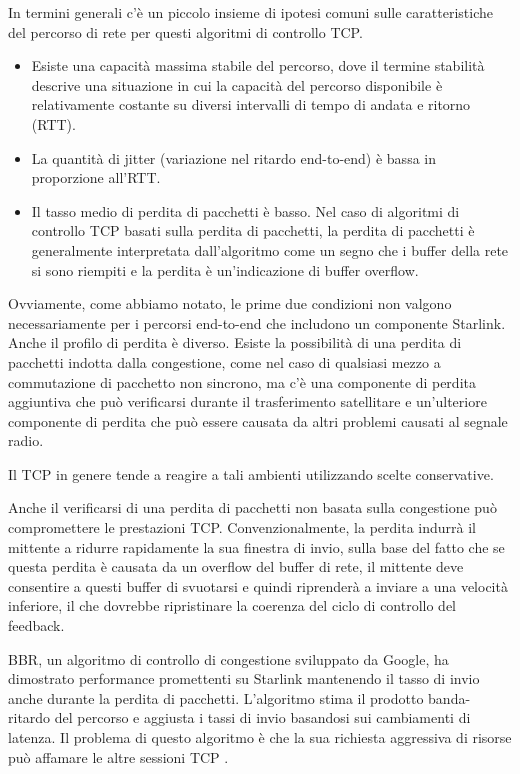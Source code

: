 In termini generali c'è un piccolo insieme di ipotesi comuni sulle caratteristiche del percorso di rete per questi algoritmi di controllo TCP.
\begin{itemize}
  \item Esiste una capacità massima stabile del percorso, dove il termine stabilità descrive una situazione in cui la capacità del percorso disponibile è relativamente costante su diversi intervalli di tempo di andata e ritorno (RTT).
  \item La quantità di jitter (variazione nel ritardo end-to-end) è bassa in proporzione all'RTT.
  \item Il tasso medio di perdita di pacchetti è basso. Nel caso di algoritmi di controllo TCP basati sulla perdita di pacchetti, la perdita di pacchetti è generalmente interpretata dall'algoritmo come un segno che i buffer della rete si sono riempiti e la perdita è un'indicazione di buffer overflow.
\end{itemize}

Ovviamente, come abbiamo notato, le prime due condizioni non valgono necessariamente per i percorsi end-to-end che includono un componente Starlink.
Anche il profilo di perdita è diverso.
Esiste la possibilità di una perdita di pacchetti indotta dalla congestione, come nel caso di qualsiasi mezzo a commutazione di pacchetto non sincrono, ma c'è una componente di perdita aggiuntiva che può verificarsi durante il trasferimento satellitare e un'ulteriore componente di perdita che può essere causata da altri problemi causati al segnale radio.

Il TCP in genere tende a reagire a tali ambienti utilizzando scelte conservative.

Anche il verificarsi di una perdita di pacchetti non basata sulla congestione può compromettere le prestazioni TCP. Convenzionalmente, la perdita indurrà il mittente a ridurre rapidamente la sua finestra di invio, sulla base del fatto che se questa perdita è causata da un overflow del buffer di rete, il mittente deve consentire a questi buffer di svuotarsi e quindi riprenderà a inviare a una velocità inferiore, il che dovrebbe ripristinare la coerenza del ciclo di controllo del feedback.

BBR, un algoritmo di controllo di congestione sviluppato da Google, ha dimostrato performance promettenti su Starlink mantenendo il tasso di invio anche durante la perdita di pacchetti.
L'algoritmo stima il prodotto banda-ritardo del percorso e aggiusta i tassi di invio basandosi sui cambiamenti di latenza.
Il problema di questo algoritmo è che la sua richiesta aggressiva di risorse può affamare le altre sessioni TCP \cite{geoff_huston_transport_2024}.

